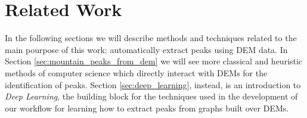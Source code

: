 \chapter{Related Work}
\label{chapter2}
\thispagestyle{plain}

In the following sections we will describe methods and techniques related to the main pourpose of this work: automatically extract peaks using DEM data. In Section \ref{sec:mountain_peaks_from_dem} we will see more classical and heuristic methods of computer science which directly interact with DEMs for the identification of peaks. Section \ref{sec:deep_learning}, instead, is an introduction to \textit{Deep Learning}, the building block for the techniques used in the development of our workflow for learning how to extract peaks from graphs built over DEMs. 

